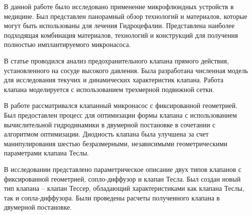 \documentclass[14pt,a4paper]{article}
\begin{document}
        В данной работе \cite{article} было исследовано применение микрофлюидных устройств в медицине. Был представлен панорамный обзор технологий и материалов, которые могут быть использованы для лечения Гидроцефалии. Представлена наиболее подходящая комбинация материалов, технологий и конструкций для получения полностью имплантируемого микронасоса. 
        
        В статье \cite{SONG2014407} проводился анализ предохранительного клапана прямого действия, установленного на сосуде высокого давления. Была разработана численная модель для исследования текучих и динамических характеристик клапана. Работа клапана моделируется с использованием трехмерной подвижной сетки.
        
        В работе \cite{OptimizationOfTheFixed-GeometryValve} рассматривался клапанный микронасос с фиксированной геометрией. Был предоставлен процесс для оптимизации формы клапана с использованием вычислительной гидродинамики в двумерной постановке в сочетании с алгоритмом оптимизации. Диодность клапана была улучшена за счет манипулирования шестью безразмерными, независимыми геометрическими параметрами клапана Теслы.
        
        В исследовании \cite{inproceedings} представлено параметрическое описание двух типов клапанов с фиксированной геометрией, сопло-диффузор и клапан Тесла. Был создан новый тип клапана -- клапан Тессер, обладающий характеристиками как клапана Теслы, так и сопла-диффузора. Были проведены расчеты полученного клапана в двумерной постановке. 
                       
        
           



\end{document}
